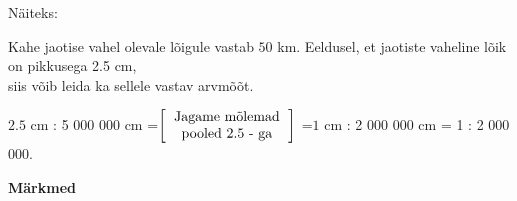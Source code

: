\begin{center}
{{{\begin{flushleft}
\vspace{2mm}
\hspace{5mm}
Näiteks: 

\vspace{5mm}
\hspace{5mm}

\vspace{2mm}
\hspace{5mm}
Kahe jaotise vahel olevale lõigule vastab $50$ km. 
Eeldusel, et jaotiste vaheline lõik on pikkusega 2.5 cm, \\ \hspace{5mm} siis võib leida ka sellele vastav arvmõõt. 

\vspace{2mm}
\hspace{5mm}
$2.5$ cm : 5 000 000 cm =$ \left[\begin{tabular}{c}
Jagame mõlemad\\
pooled 2.5 - ga
\end{tabular} \right] $ =$1$ cm : 2 000 000 cm = 1 : 2 000 000.


\end{flushleft}
}}}
\end{center}
\vspace{0.5cm}

\textbf{Märkmed}\\
\vspace{2mm}
\begin{mdframed}[style=graphpaper]
\vspace{6cm}
\end{mdframed}